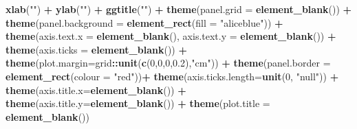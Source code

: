\documentclass[12pt,twoside]{reedthesis}
\newenvironment{Shaded}{\begin{snugshade}}{\end{snugshade}}
\newcommand{\DataTypeTok}[1]{\textcolor[rgb]{0.13,0.29,0.53}{#1}}
\newcommand{\DecValTok}[1]{\textcolor[rgb]{0.00,0.00,0.81}{#1}}
\newcommand{\FloatTok}[1]{\textcolor[rgb]{0.00,0.00,0.81}{#1}}
\newcommand{\KeywordTok}[1]{\textcolor[rgb]{0.13,0.29,0.53}{\textbf{#1}}}
\newcommand{\NormalTok}[1]{#1}
\newcommand{\OperatorTok}[1]{\textcolor[rgb]{0.81,0.36,0.00}{\textbf{#1}}}
\newcommand{\StringTok}[1]{\textcolor[rgb]{0.31,0.60,0.02}{#1}}
\begin{document}
\begin{Shaded}
\begin{Highlighting}[]
\StringTok{  }\KeywordTok{xlab}\NormalTok{(}\StringTok{""}\NormalTok{) }\OperatorTok{+}\StringTok{ }
\StringTok{  }\KeywordTok{ylab}\NormalTok{(}\StringTok{""}\NormalTok{) }\OperatorTok{+}\StringTok{ }
\StringTok{  }\KeywordTok{ggtitle}\NormalTok{(}\StringTok{""}\NormalTok{) }\OperatorTok{+}
\StringTok{  }\KeywordTok{theme}\NormalTok{(}\DataTypeTok{panel.grid =} \KeywordTok{element_blank}\NormalTok{()) }\OperatorTok{+}
\StringTok{  }\KeywordTok{theme}\NormalTok{(}\DataTypeTok{panel.background =} \KeywordTok{element_rect}\NormalTok{(}\DataTypeTok{fill =} \StringTok{"aliceblue"}\NormalTok{)) }\OperatorTok{+}
\StringTok{  }\KeywordTok{theme}\NormalTok{(}\DataTypeTok{axis.text.x =} \KeywordTok{element_blank}\NormalTok{(), }\DataTypeTok{axis.text.y =} \KeywordTok{element_blank}\NormalTok{()) }\OperatorTok{+}
\StringTok{  }\KeywordTok{theme}\NormalTok{(}\DataTypeTok{axis.ticks =} \KeywordTok{element_blank}\NormalTok{()) }\OperatorTok{+}
\StringTok{  }\KeywordTok{theme}\NormalTok{(}\DataTypeTok{plot.margin=}\NormalTok{grid}\OperatorTok{::}\KeywordTok{unit}\NormalTok{(}\KeywordTok{c}\NormalTok{(}\DecValTok{0}\NormalTok{,}\DecValTok{0}\NormalTok{,}\DecValTok{0}\NormalTok{,}\FloatTok{0.2}\NormalTok{),}\StringTok{"cm"}\NormalTok{)) }\OperatorTok{+}\StringTok{ }
\StringTok{  }\KeywordTok{theme}\NormalTok{(}\DataTypeTok{panel.border =} \KeywordTok{element_rect}\NormalTok{(}\DataTypeTok{colour =} \StringTok{"red"}\NormalTok{))}\OperatorTok{+}
\StringTok{  }\KeywordTok{theme}\NormalTok{(}\DataTypeTok{axis.ticks.length=}\KeywordTok{unit}\NormalTok{(}\DecValTok{0}\NormalTok{, }\StringTok{"null"}\NormalTok{)) }\OperatorTok{+}
\StringTok{  }\KeywordTok{theme}\NormalTok{(}\DataTypeTok{axis.title.x=}\KeywordTok{element_blank}\NormalTok{()) }\OperatorTok{+}
\StringTok{  }\KeywordTok{theme}\NormalTok{(}\DataTypeTok{axis.title.y=}\KeywordTok{element_blank}\NormalTok{()) }\OperatorTok{+}
\StringTok{  }\KeywordTok{theme}\NormalTok{(}\DataTypeTok{plot.title =} \KeywordTok{element_blank}\NormalTok{())}


\end{Highlighting}
\end{Shaded}
\end{document}
